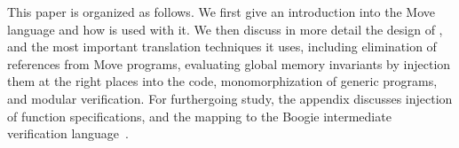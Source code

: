 This paper is organized as follows. We first give an introduction into the Move
language and how \MVP is used with it. We then discuss in more detail the design
of \MVP, and the most important translation techniques it uses, including
elimination of references from Move programs, evaluating global memory
invariants by injection them at the right places into the code, monomorphization
of generic programs, and modular verification. For furthergoing study, the
appendix discusses injection of function specifications, and the mapping to the
Boogie intermediate verification language~\cite{BOOGIE}.


